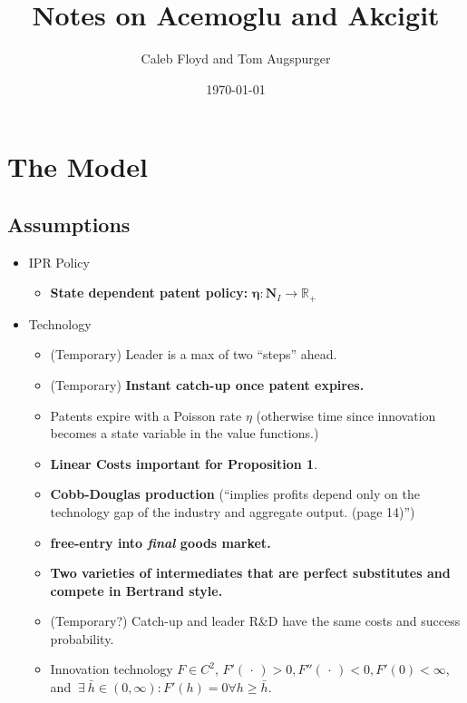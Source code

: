 \documentclass[11pt]{article}
\title{Notes on Acemoglu and Akcigit}
\author{Caleb Floyd and Tom Augspurger}
\date{\today}
\begin{document}
\maketitle

\section{The Model}
\label{sec:the_model}

\subsection{Assumptions}
\label{sub:assumptions}

  \begin{itemize}
    \item IPR Policy
    \begin{itemize}
      \item \textbf{State dependent patent policy:} $\bm{\eta} : \bm{N}_I \rightarrow \mathbb{R_+}$ 
    \end{itemize}

    \item Technology
    \begin{itemize}
      \item (Temporary) Leader is a max of two ``steps'' ahead.
      \item (Temporary) \textbf{Instant catch-up once patent expires.}
      \item Patents expire with a Poisson rate $\eta$ (otherwise time since innovation becomes a state variable in the value functions.)
      \item \textbf{Linear Costs important for Proposition 1}.
      \item \textbf{Cobb-Douglas production} (``implies profits depend only on the technology gap of the industry and aggregate output. (page 14)'')
      \item \textbf{free-entry into \emph{final} goods market.}  
      \item \textbf{Two varieties of intermediates that are perfect substitutes and compete in Bertrand style.}
      \item (Temporary?) Catch-up and leader R\&D have the same costs and success probability.
      \item Innovation technology $F \in C^2$, $F'(\,\cdot\,) > 0, F''(\,\cdot\,) < 0, F'(0) < \infty$, and $\ \exists\ \bar{h} \in (0, \infty) : F'(h) = 0 \forall h \geq \bar{h}$.
    \end{itemize}
    

\end{itemize}
\end{document}
